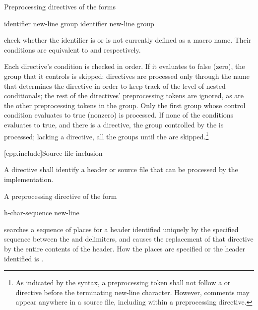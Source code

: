 \pnum
Preprocessing directives of the forms

\begin{ncbnftab}
\>\>identifier new-line group\opt\br
{}%
\>\>identifier new-line group\opt
{}%
\end{ncbnftab}

check whether the identifier is or is not currently defined as a macro name.
Their conditions are equivalent to
and
respectively.

\pnum
Each directive's condition is checked in order.
If it evaluates to false (zero),
the group that it controls is skipped:
directives are processed only through the name that determines
the directive in order to keep track of the level
of nested conditionals;
the rest of the directives' preprocessing tokens are ignored,
as are the other preprocessing tokens in the group.
Only the first group
whose control condition evaluates to true (nonzero) is processed.
If none of the conditions evaluates to true,
and there is a
%
directive,
the group controlled by the
is processed; lacking a
directive, all the groups until the
%
are skipped.\footnote{As indicated by the syntax,
a preprocessing token shall not follow a
or
directive before the terminating new-line character.
However,
comments may appear anywhere in a source file,
including within a preprocessing directive.}

[cpp.include]{Source file inclusion}
%
%

\pnum
A
directive shall identify a header or source file
that can be processed by the implementation.

\pnum
{}%
A preprocessing directive of the form

\begin{ncsimplebnf}
h-char-sequence\terminal{>} new-line
\end{ncsimplebnf}

searches a sequence of
places
for a header identified uniquely by the specified sequence
between the
\tcode{<}
and
\tcode{>}
delimiters,
and causes the replacement of that
directive by the entire contents of the header.
How the places are specified
or the header identified
is .

